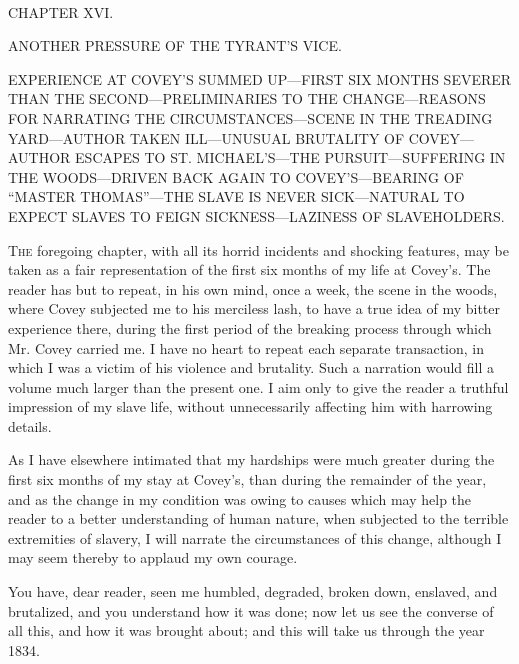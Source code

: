 {\protect\hypertarget{222}{}{}}

~

{CHAPTER XVI.}

ANOTHER PRESSURE OF THE TYRANT'S VICE.

{EXPERIENCE AT COVEY'S SUMMED UP---FIRST SIX MONTHS SEVERER THAN THE
SECOND---PRELIMINARIES TO THE CHANGE---REASONS FOR NARRATING THE
CIRCUMSTANCES---SCENE IN THE TREADING YARD---AUTHOR TAKEN ILL---UNUSUAL
BRUTALITY OF COVEY---AUTHOR ESCAPES TO ST. MICHAEL'S---THE
PURSUIT---SUFFERING IN THE WOODS---DRIVEN BACK AGAIN TO
COVEY'S---BEARING OF ``MASTER THOMAS''---THE SLAVE IS NEVER
SICK---NATURAL TO EXPECT SLAVES TO FEIGN SICKNESS---LAZINESS OF
SLAVEHOLDERS.}

\textsc{The} foregoing chapter, with all its horrid incidents and
shocking features, may be taken as a fair representation of the first
six months of my life at Covey's. The reader has but to repeat, in his
own mind, once a week, the scene in the woods, where Covey subjected me
to his merciless lash, to have a true idea of my bitter experience
there, during the first period of the breaking process through which Mr.
Covey carried me. I have no heart to repeat each separate transaction,
in which I was a victim of his violence and brutality. Such a narration
would fill a volume much larger than the present one. I aim only to give
the reader a truthful impression of my slave life, without unnecessarily
affecting him with harrowing details.

As I have elsewhere intimated that my hardships were much greater during
the first six months of my stay at Covey's, than during the remainder of
the year, {\protect\hypertarget{223}{}{}}and as the change in my
condition was owing to causes which may help the reader to a better
understanding of human nature, when subjected to the terrible
extremities of slavery, I will narrate the circumstances of this change,
although I may seem thereby to applaud my own courage.

You have, dear reader, seen me humbled, degraded, broken down, enslaved,
and brutalized, and you understand how it was done; now let us see the
converse of all this, and how it was brought about; and this will take
us through the year 1834.


